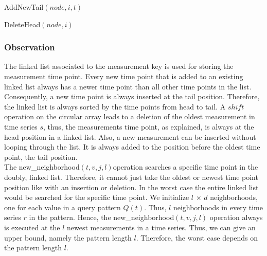 \documentclass[abstracton,12pt]{scrreprt}
\begin{document}
\begin{algorithm}[H]
	\IncMargin{1em}
	\SetAlgoLined
	\DontPrintSemicolon
	
	\caption{AddNewTail$(node, i, t)$}
	\label{AddToList}
\end{algorithm}



\begin{algorithm}[H]
	\IncMargin{1em}
	\DontPrintSemicolon
	

	\caption{DeleteHead$(node, i)$}
		\label{deleteListValue}
\end{algorithm}

\subsubsection{Observation}
The linked list associated to the measurement key is used for storing the measurement time point. Every new time point that is added to an existing linked list always has a newer time point than all other time points in the list. Consequently, a new time point is always inserted at the tail position. Therefore, the linked list is always sorted by the time points from head to tail. A $shift$ operation on the circular array leads to a deletion of the oldest measurement in time series $s$, thus, the measurements time point, as explained, is always at the head position in a linked list. Also, a new measurement can be inserted without looping through the list. It is always added to the position before the oldest time point, the tail position. \\
The new\_neighborhood$(t,v,j,l)$operation searches a specific time point in the doubly, linked list. Therefore, it cannot just take the oldest or newest time point position like with an insertion or deletion. In the worst case the entire linked list would be searched for the specific time point. We initialize $l$ $\times$ $d$ neighborhoods, one for each value in a query pattern $Q(t)$. Thus, $l$ neighborhoods in every time series $r$ in the pattern. Hence, the new\_neighborhood$(t,v,j,l)$ operation always is executed at the $l$ newest measurements in a time series. Thus, we can give an upper bound, namely the pattern length $l$. Therefore, the worst case depends on the pattern length $l$. 
\end{document}
